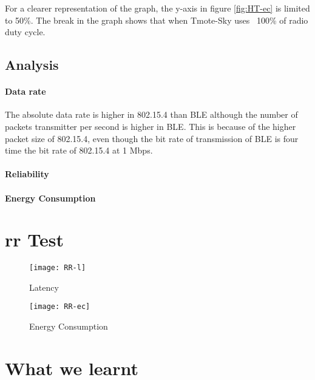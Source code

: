 For a clearer representation of the graph, the y-axis in figure \ref{fig:HT-ec} is limited to 50\%. The break in the graph shows that when Tmote-Sky uses ~100\% of radio duty cycle.

\subsection{Analysis}
\paragraph{Data rate}
The absolute data rate is higher in 802.15.4 than BLE although the number of packets transmitter per second is higher in BLE. This is because of the higher packet size of 802.15.4, even though the bit rate of transmission of BLE is four time the bit rate of 802.15.4 at 1 Mbps.

\paragraph{Reliability}

\paragraph{Energy Consumption}

\section{\acrlong{rr} Test}


\begin{figure}[h]
\texttt{[image: RR-l]}
\caption{Latency}
\label{fig:RR-l}
\end{figure}

\begin{figure}[h]
\texttt{[image: RR-ec]}
\caption{Energy Consumption}
\label{fig:RR-ec}
\end{figure}

\section{What we learnt}